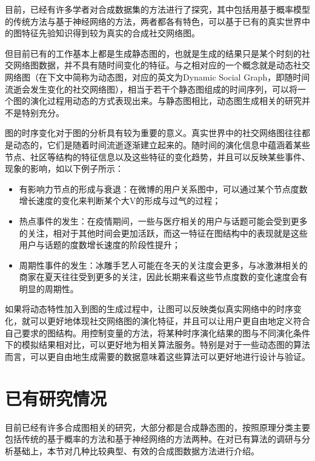目前，已经有许多学者对合成数据集的方法进行了探究，其中包括用基于概率模型的传统方法与基于神经网络的方法，两者都各有特色，可以基于已有的真实世界中的图特征先验知识得到较为真实的合成社交网络图。

但目前已有的工作基本上都是生成静态图的，也就是生成的结果只是某个时刻的社交网络图数据，并不具有随时间变化的特征。与之相对应的一个概念就是动态社交网络图（在下文中简称为动态图，对应的英文为Dynamic Social Graph，即随时间流逝会发生变化的社交网络图\cite{sarkar2006dynamic}），相当于若干个静态图组成的时间序列，可以将一个图的演化过程用动态的方式表现出来。与静态图相比，动态图生成相关的研究并不是特别充分。

图的时序变化对于图的分析具有较为重要的意义。真实世界中的社交网络图往往都是动态的，它们是随着时间流逝逐渐建立起来的。随时间的演化信息中蕴涵着某些节点、社区等结构的特征信息以及这些特征的变化趋势，并且可以反映某些事件、现象的影响，如以下例子所示：

\begin{itemize}
  \item 有影响力节点的形成与衰退\cite{braha2006centrality}：在微博的用户关系图中，可以通过某个节点度数增长速度的变化来判断某个大V的形成与过气的过程；
  \item 热点事件的发生：在疫情期间，一些与医疗相关的用户与话题可能会受到更多的关注，相对于其他时间会更加活跃，而这一特征在图结构中的表现就是这些用户与话题的度数增长速度的阶段性提升；
  \item 周期性事件的发生：冰雕手艺人可能在冬天的关注度会更多，与冰激淋相关的商家在夏天往往受到更多的关注，因此长期来看这些节点度数的变化速度会有明显的周期性。
\end{itemize}

\vspace{0.2cm}

如果将动态特性加入到图的生成过程中，让图可以反映类似真实网络中的时序变化，就可以更好地体现社交网络图的演化特征，并且可以让用户更自由地定义符合自己要求的图结构。用控制变量的方法，将某种时序演化结果的图与不同演化条件下的模拟结果相对比，可以更好地为相关算法服务。特别是对于一些动态图的算法而言，可以更自由地生成需要的数据意味着这些算法可以更好地进行设计与验证。

\section{已有研究情况}

目前已经有许多合成图相关的研究，大部分都是合成静态图的，按照原理分类主要包括传统的基于概率的方法和基于神经网络的方法两种。在对已有算法的调研与分析基础上，本节对几种比较典型、有效的合成图数据方法进行介绍。


